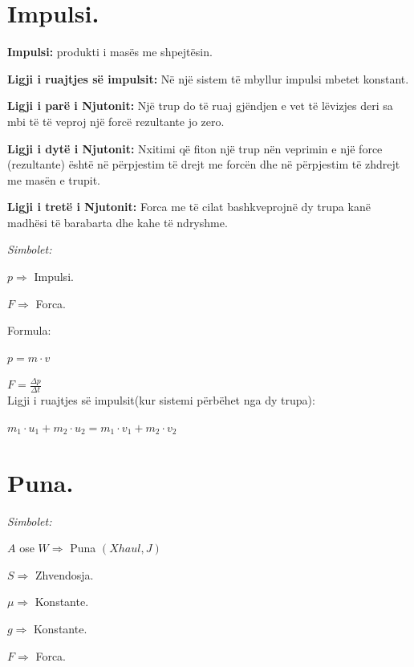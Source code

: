 \documentclass[twocolumn]{article}
\begin{document}
	
	\section{Impulsi.}
	
	\textbf{Impulsi:} produkti i masës me shpejtësin.
	
	\textbf{Ligji i ruajtjes së impulsit:} Në një sistem të mbyllur impulsi mbetet konstant.
	
	\textbf{Ligji i parë i Njutonit:} Një trup do të ruaj gjëndjen e vet të lëvizjes deri sa mbi të të veproj një forcë rezultante jo zero.
	
	\textbf{Ligji i dytë i Njutonit:} Nxitimi që fiton një trup nën veprimin e një force (rezultante) është në përpjestim të drejt me forcën dhe në përpjestim të zhdrejt me masën e trupit.
	
	\textbf{Ligji i tretë i Njutonit:} Forca me të cilat bashkveprojnë dy trupa kanë madhësi të barabarta dhe kahe të ndryshme.
	
	\begin{center}
		\textit{Simbolet:}
	\end{center}
	
	$p \Rightarrow $ Impulsi.
	
	$F \Rightarrow $ Forca.
	
	\begin{center}
		Formula:
	\end{center}
	
	$ p = m \cdot v$
	
	$F=\frac{\Delta p }{\Delta t}$\\
	
	
	Ligji i ruajtjes së impulsit(kur sistemi përbëhet nga dy trupa):
	
	$m_1 \cdot u_1 + m_2 \cdot u_2 =m_1 \cdot v_1 + m_2 \cdot v_2$
	
	\section{Puna.}
	
	\begin{center}
		\textit{Simbolet:}
	\end{center}
	
	$A$ ose $W \Rightarrow$ Puna $(Xhaul,J)$
	
	$S \Rightarrow $ Zhvendosja.
	
	$\mu \Rightarrow$ Konstante.
	
	$g \Rightarrow$ Konstante.
	
	$F \Rightarrow$ Forca.
	
\end{document}

